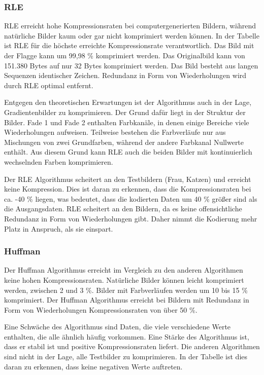 \documentclass[conference]{IEEEtran}
\begin{document}
\subsubsection{RLE}

RLE erreicht hohe Kompressionsraten bei computergenerierten Bildern, während natürliche
Bilder kaum oder gar nicht komprimiert werden können.
In der Tabelle ist RLE für die höchste erreichte Kompressionsrate verantwortlich.
Das Bild mit der Flagge kann um 99,98 \% komprimiert werden.
Das Originalbild kann von 151.380 Bytes auf nur 32 Bytes komprimiert werden.
Das Bild besteht aus langen Sequenzen identischer Zeichen. Redundanz in Form von
Wiederholungen wird durch RLE optimal entfernt.

Entgegen den theoretischen Erwartungen ist der Algorithmus auch in der Lage,
Gradientenbilder zu komprimieren. Der Grund dafür liegt in der Struktur der Bilder.
Fade 1 und Fade 2 enthalten Farbkanäle, in denen einige Bereiche viele Wiederholungen aufweisen.
Teilweise bestehen die Farbverläufe nur aus Mischungen von zwei Grundfarben, während der
andere Farbkanal Nullwerte enthält.
Aus diesem Grund kann RLE auch die beiden Bilder mit kontinuierlich wechselnden Farben komprimieren.

Der RLE Algorithmus scheitert an den Testbildern (Frau, Katzen) und erreicht keine
Kompression.
Dies ist daran zu erkennen, dass die Kompressionsraten bei ca. -40 \% liegen, was
bedeutet, dass die kodierten Daten um 40 \% größer sind als die Ausgangsdaten.
RLE scheitert an den Bildern, da es keine offensichtliche Redundanz in Form von Wiederholungen gibt.
Daher nimmt die Kodierung mehr Platz in Anspruch, als sie einspart.


\subsubsection{Huffman}

Der Huffman Algorithmus erreicht im Vergleich zu den anderen Algorithmen keine
hohen Kompressionsraten.
Natürliche Bilder können leicht komprimiert werden, zwischen 2 und 3 \%.
Bilder mit Farbverläufen werden um 10 bis 15 \% komprimiert.
Der Huffman Algorithmus erreicht bei Bildern mit Redundanz in Form von
Wiederholungen Kompressionsraten von über 50 \%.

Eine Schwäche des Algorithmus sind Daten, die viele verschiedene Werte enthalten,
die alle ähnlich häufig vorkommen.
Eine Stärke des Algorithmus ist, dass er stabil ist und positive Kompressionsraten liefert.
Die anderen Algorithmen sind nicht in der Lage, alle Testbilder zu komprimieren.
In der Tabelle ist dies daran zu erkennen, dass keine negativen Werte auftreten.
\end{document}
